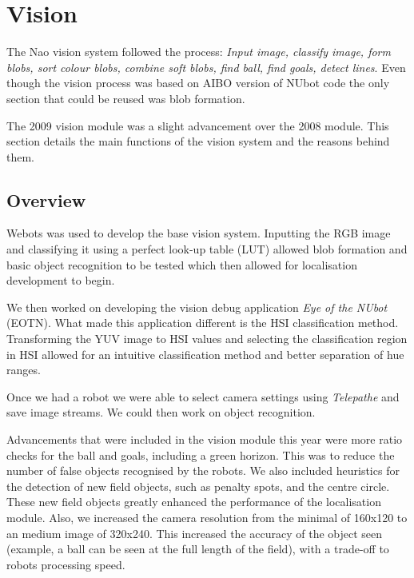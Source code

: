 \section{Vision}
The Nao vision system followed the process: \emph{Input image, classify image, form blobs, sort colour blobs, combine soft blobs, find ball, find goals, detect lines}. Even though the vision process was based on AIBO version of NUbot code the only section that could be reused was blob formation. 

The 2009 vision module was a slight advancement over the 2008 module. This section details the main functions of the vision system and the reasons behind them. 
\subsection{Overview}

Webots was used to develop the base vision system. Inputting the RGB image and classifying it using a perfect look-up table (LUT) allowed blob formation and basic object recognition to be tested which then allowed for localisation development to begin.

We then worked on developing the vision debug application \emph{Eye of the NUbot} (EOTN). What made this application different is the HSI classification method. Transforming the YUV image to HSI values and selecting the classification region in HSI allowed for an intuitive classification method and better separation of hue ranges. 

Once we had a robot we were able to select camera settings using \emph{Telepathe} and save image streams. We could then work on object recognition.

Advancements that were included in the vision module this year were more ratio checks for the ball and goals, including a green horizon. This was to reduce the number of false objects recognised by the robots. We also included heuristics for the detection of new field objects, such as penalty spots, and the centre circle. These new field objects greatly enhanced the performance of the localisation module. Also, we increased the camera resolution from the minimal of 160x120 to an medium image of 320x240. This increased the accuracy of the object seen (example, a ball can be seen at the full length of the field), with a trade-off to robots processing speed.



